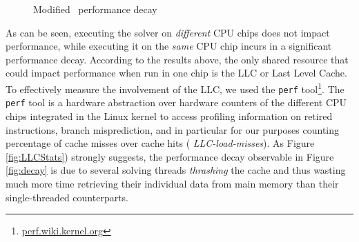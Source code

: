 \begin{figure}
  \begin{center}
     
    \caption{Modified \pling\ performance decay}
  \end{center}
\end{figure} 

As can be seen, executing the solver on {\em different} CPU chips does
not impact performance, while executing it on the {\em same} CPU chip
incurs in a significant performance decay. According to the results
above, the only shared resource that could impact performance when run
in one chip is the LLC or Last Level Cache. To effectively measure the
involvement of the LLC, we used the {\tt perf}
tool\footnote{\url{perf.wiki.kernel.org}}. The {\tt perf} tool is a
hardware abstraction over hardware counters of the different CPU chips
integrated in the Linux kernel to access profiling information on
retired instructions, branch misprediction, and in particular for our
purposes counting percentage of cache misses over cache hits ({\em
  LLC-load-misses}). As Figure \ref{fig:LLCStats}) strongly suggests,
the performance decay observable in Figure \ref{fig:decay} is due to
several solving threads {\em thrashing} the cache and thus wasting
much more time retrieving their individual data from main memory than
their single-threaded counterparts.

